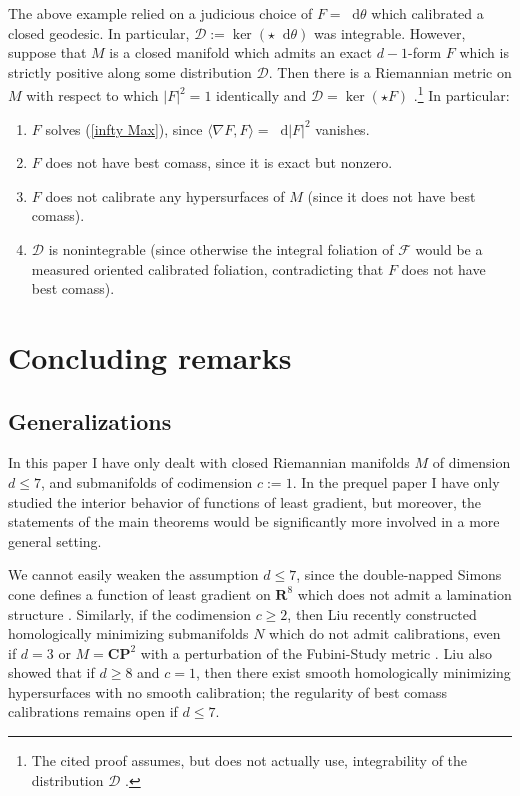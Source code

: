 \documentclass[reqno,11pt]{amsart}
\newcommand{\RR}{\mathbf{R}}
\newcommand{\CC}{\mathbf{C}}
\newcommand{\PP}{\mathbf P}
\newcommand*\dif{\mathop{}\!\mathrm{d}}
\theoremstyle{definition}
\numberwithin{equation}{section}
\begin{document}
The above example relied on a judicious choice of $F = \dif \theta$ which calibrated a closed geodesic.
In particular, $\mathscr D := \ker(\star \dif \theta)$ was integrable.
However, suppose that $M$ is a closed manifold which admits an exact $d - 1$-form $F$ which is strictly positive along some distribution $\mathscr D$.
Then there is a Riemannian metric on $M$ with respect to which $|F|^2 = 1$ identically and $\mathscr D = \ker(\star F)$ \cite[Proposition 2.7]{Harvey82foliations}.\footnote{The cited proof assumes, but does not actually use, integrability of the distribution $\mathscr D$ \cite[Proposition 4.1]{bangert_cui_2017}.}
In particular:
\begin{enumerate}
\item $F$ solves (\ref{infty Max}), since $\langle \nabla F, F\rangle = \dif |F|^2$ vanishes.
\item $F$ does not have best comass, since it is exact but nonzero.
\item $F$ does not calibrate any hypersurfaces of $M$ (since it does not have best comass).
\item $\mathscr D$ is nonintegrable (since otherwise the integral foliation of $\mathscr F$ would be a measured oriented calibrated foliation, contradicting that $F$ does not have best comass).
\end{enumerate}


\section{Concluding remarks}\label{open problems}
\subsection{Generalizations}
In this paper I have only dealt with closed Riemannian manifolds $M$ of dimension $d \leq 7$, and submanifolds of codimension $c := 1$.
In the prequel paper \cite{BackusCML} I have only studied the interior behavior of functions of least gradient, but moreover, the statements of the main theorems would be significantly more involved in a more general setting.

We cannot easily weaken the assumption $d \leq 7$, since the double-napped Simons cone defines a function of least gradient on $\RR^8$ which does not admit a lamination structure \cite{BackusCML}.
Similarly, if the codimension $c \geq 2$, then Liu recently constructed homologically minimizing submanifolds $N$ which do not admit calibrations, even if $d = 3$ or $M = \CC \PP^2$ with a perturbation of the Fubini-Study metric \cite{liu2023homologically}.
Liu also showed that if $d \geq 8$ and $c = 1$, then there exist smooth homologically minimizing hypersurfaces with no smooth calibration; the regularity of best comass calibrations remains open if $d \leq 7$.
\end{document}
